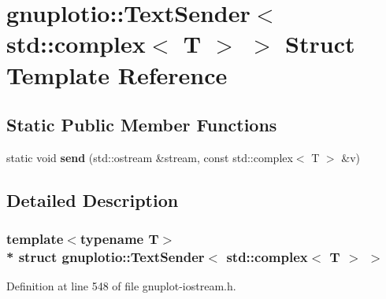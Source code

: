 \hypertarget{structgnuplotio_1_1_text_sender_3_01std_1_1complex_3_01_t_01_4_01_4}{}\section{gnuplotio\+:\+:Text\+Sender$<$ std\+:\+:complex$<$ T $>$ $>$ Struct Template Reference}
\label{structgnuplotio_1_1_text_sender_3_01std_1_1complex_3_01_t_01_4_01_4}
\subsection*{Static Public Member Functions}
\begin{DoxyCompactItemize}
\item 
static void {\bfseries send} (std\+::ostream \&stream, const std\+::complex$<$ T $>$ \&v)\hypertarget{structgnuplotio_1_1_text_sender_3_01std_1_1complex_3_01_t_01_4_01_4_ad524aa3e121d0ebd66346d77f1fd5a1c}{}\label{structgnuplotio_1_1_text_sender_3_01std_1_1complex_3_01_t_01_4_01_4_ad524aa3e121d0ebd66346d77f1fd5a1c}

\end{DoxyCompactItemize}


\subsection{Detailed Description}
\subsubsection*{template$<$typename T$>$\\*
struct gnuplotio\+::\+Text\+Sender$<$ std\+::complex$<$ T $>$ $>$}



Definition at line 548 of file gnuplot-\/iostream.\+h.

